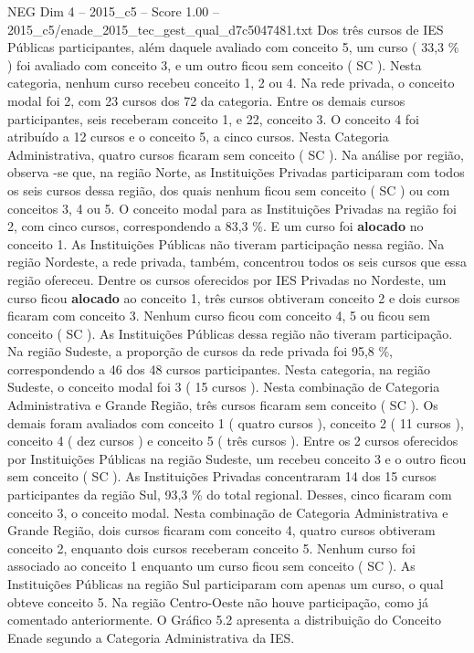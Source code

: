 \begin{textsample}{NEG Dim 4 – 2015\_c5 – Score 1.00 – 2015\_c5/enade\_2015\_tec\_gest\_qual\_d7c5047481.txt}
Dos três cursos de IES Públicas participantes, além daquele avaliado com conceito 5, um curso ( 33,3 \% ) foi avaliado com conceito 3, e um outro ficou sem conceito ( SC ).
Nesta categoria, nenhum curso recebeu conceito 1, 2 ou 4.
Na rede privada, o conceito modal foi 2, com 23 cursos dos 72 da categoria.
Entre os demais cursos participantes, seis receberam conceito 1, e 22, conceito 3.
O conceito 4 foi atribuído a 12 cursos e o conceito 5, a cinco cursos.
Nesta Categoria Administrativa, quatro cursos ficaram sem conceito ( SC ).
Na análise por região, observa -se que, na região Norte, as Instituições Privadas participaram com todos os seis cursos dessa região, dos quais nenhum ficou sem conceito ( SC ) ou com conceitos 3, 4 ou 5.
O conceito modal para as Instituições Privadas na região foi 2, com cinco cursos, correspondendo a 83,3 \%.
E um curso foi \textbf{alocado} no conceito 1.
As Instituições Públicas não tiveram participação nessa região.
Na região Nordeste, a rede privada, também, concentrou todos os seis cursos que essa região ofereceu.
Dentre os cursos oferecidos por IES Privadas no Nordeste, um curso ficou \textbf{alocado} ao conceito 1, três cursos obtiveram conceito 2 e dois cursos ficaram com conceito 3.
Nenhum curso ficou com conceito 4, 5 ou ficou sem conceito ( SC ).
As Instituições Públicas dessa região não tiveram participação.
Na região Sudeste, a proporção de cursos da rede privada foi 95,8 \%, correspondendo a 46 dos 48 cursos participantes.
Nesta categoria, na região Sudeste, o conceito modal foi 3 ( 15 cursos ).
Nesta combinação de Categoria Administrativa e Grande Região, três cursos ficaram sem conceito ( SC ).
Os demais foram avaliados com conceito 1 ( quatro cursos ), conceito 2 ( 11 cursos ), conceito 4 ( dez cursos ) e conceito 5 ( três cursos ).
Entre os 2 cursos oferecidos por Instituições Públicas na região Sudeste, um recebeu conceito 3 e o outro ficou sem conceito ( SC ).
As Instituições Privadas concentraram 14 dos 15 cursos participantes da região Sul, 93,3 \% do total regional.
Desses, cinco ficaram com conceito 3, o conceito modal.
Nesta combinação de Categoria Administrativa e Grande Região, dois cursos ficaram com conceito 4, quatro cursos obtiveram conceito 2, enquanto dois cursos receberam conceito 5.
Nenhum curso foi associado ao conceito 1 enquanto um curso ficou sem conceito ( SC ).
As Instituições Públicas na região Sul participaram com apenas um curso, o qual obteve conceito 5.
Na região Centro-Oeste não houve participação, como já comentado anteriormente.
O Gráfico 5.2 apresenta a distribuição do Conceito Enade segundo a Categoria Administrativa da IES.

\end{textsample}
